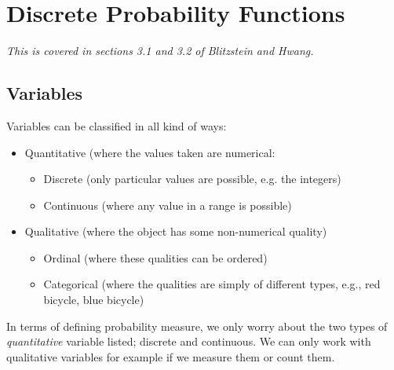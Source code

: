 \documentclass[12pt]{extbook}
\begin{document}


\chapter{Discrete Probability Functions}

\textit{This is covered in sections 3.1 and 3.2 of Blitzstein and Hwang.}

\section{Variables}

Variables can be classified in all kind of ways:
\begin{itemize}
\item Quantitative (where the values taken are numerical:
  \begin{itemize}
  \item Discrete (only particular values are possible, e.g. the
    integers)
  \item Continuous (where any value in a range is possible)
  \end{itemize}
\item Qualitative (where the object has some non-numerical quality)
  \begin{itemize}
  \item Ordinal (where these qualities can be ordered)
  \item Categorical (where the qualities are simply of different
    types, e.g., red bicycle, blue bicycle)
  \end{itemize}
\end{itemize}


In terms of defining probability measure, we 
only worry about the two
types of \emph{quantitative} variable listed; discrete and continuous.  
We can only work with qualitative variables for example if we measure
them or count them.


\end{document}
